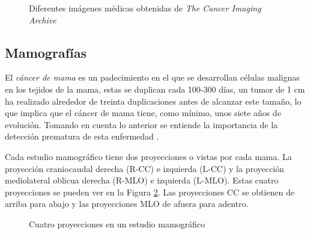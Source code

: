 \begin{figure}[h]
    \centering

    \hspace{1cm}
    \hspace{1cm}

  \caption[Algunos tipos de imágenes médicas]{Diferentes imágenes médicas
  obtenidas de \textit{The Cancer Imaging Archive}}
  
  \label{medicalimages} \end{figure}

\subsection{Mamografías}

El \textit{cáncer de mama} es un padecimiento en el que se desarrollan células
malignas en los tejidos de la mama, estas se duplican cada 100-300 días, un
tumor de 1 cm ha realizado alrededor de treinta duplicaciones antes de alcanzar
este tamaño, lo que implica que el cáncer de mama tiene, como mínimo, unos
siete años de evolución. Tomando en cuenta lo anterior se entiende la
importancia de la detección prematura de esta enfermedad \cite{mxcancer}.

Cada estudio mamográfico tiene dos proyecciones o vistas por cada mama. La
proyección craniocaudal derecha (R-CC) e izquierda (L-CC) y la proyección
mediolateral oblicua derecha (R-MLO) e izquierda (L-MLO). Estas cuatro
proyecciones se pueden ver en la Figura \ref{fig:views}. Las proyecciones CC se
obtienen de arriba para abajo y las proyecciones MLO de afuera para adentro.

\begin{figure}[h]
    \centering

    \hspace{1cm}

    \bigskip

    \hspace{1cm}

  \caption{Cuatro proyecciones en un estudio mamográfico}
  
  \label{fig:views}
\end{figure}

